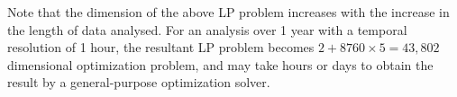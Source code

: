 \documentclass[lettersize,journal]{IEEEtran}
\newcommand{\figref}[1]{Fig.\,\ref{#1}}
\newcommand{\tabref}[1]{Table\,\ref{#1}}
\newcommand{\secref}[1]{Section\,\ref{#1}}
\begin{document}
%
Note that the dimension of the above LP problem increases with the increase in the length of data analysed. 
For an analysis over 1 year with a temporal resolution of 1 hour, the resultant LP problem becomes $2 + 8760 \times 5 = 43,802$ dimensional optimization problem, and may take hours or days to obtain the result by a general-purpose optimization solver.  



%
\end{document}

